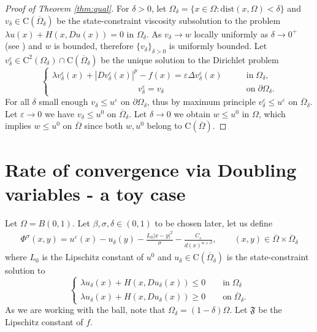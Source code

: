 \documentclass[11pt,reqno]{amsart}
\numberwithin{figure}{section}
\theoremstyle{plain}
\theoremstyle{remark}
\numberwithin{equation}{section}
\newcommand{\rmC}{\mathrm{C}}
\begin{document}
\begin{proof}[Proof of Theorem \ref{thm:qual}]
For $\delta>0$, let $\Omega_\delta = \{x\in \Omega: \mathrm{dist}(x,\Omega) < \delta\}$ and $v_\delta\in\rmC(\overline{\Omega}_\delta)$ be the state-constraint viscosity subsolution to the problem $\lambda u(x) + H(x,Du(x)) = 0$ in $\Omega_\delta$. As $v_\delta\rightarrow w$ locally uniformly as $\delta\rightarrow 0^+$ (see \cite{kim_state-constraint_2020}) and $w$ is bounded, therefore $\{v_\delta\}_{\delta>0}$ is uniformly bounded. Let $v^\varepsilon_\delta\in \rmC^2(\Omega_\delta)\cap \rmC(\overline{\Omega}_\delta)$ be the unique solution to the Dirichlet problem
\begin{equation}\label{eq:vv_eps}
\begin{cases}
    \lambda v_\delta^\varepsilon(x) + |Dv_\delta^\varepsilon(x)|^p - f(x) = \varepsilon \Delta v_\delta^\varepsilon(x) &\qquad\text{in}\;\Omega_\delta,\\
    \;\;\;\,\quad\qquad\qquad\qquad\qquad v_\delta^\varepsilon = v_\delta &\qquad \text{on}\;\partial\Omega_\delta.
\end{cases}
\end{equation}
For all $\delta$ small enough $v_\delta\leq u^\varepsilon$ on $\partial \Omega_\delta$, thus by maximum principle $v^\varepsilon_\delta \leq u^\varepsilon$ on $\overline{\Omega}_\delta$. Let $\varepsilon\to 0$ we have $v_\delta \leq u^0$ on $\overline{\Omega}_\delta$.
Let $\delta\rightarrow 0$ we obtain $w\leq u^0$ in $\Omega$, which implies $w\leq u^0$ on $\overline{\Omega}$ since both $w,u^0$ belong to $\rmC(\overline{\Omega})$.
\end{proof}

\section{Rate of convergence via Doubling variables - a toy case}
\noindent Let $\Omega = B(0,1)$. Let $\beta,\sigma,\delta \in (0,1)$ to be chosen later, let us define
\begin{align*}
    \Phi^{\sigma}(x,y) =  u^\varepsilon(x) - u_\delta(y) - \frac{L_0|x-y|^2}{\sigma}- \frac{C_\varepsilon}{d(x)^{\alpha+\beta}}, \qquad (x,y)\in \overline{\Omega}\times\overline{\Omega}_\delta
\end{align*}
where $L_0$ is the Lipschitz constant of $u^0$ and $u_\delta\in \mathrm{C}(\overline{\Omega}_\delta)$ is the state-constraint solution to
\begin{equation*}
    \begin{cases}  
    \lambda u_\delta(x) + H(x,Du_\delta(x)) \leq 0 \qquad\text{in}\; \Omega_\delta\\
    \lambda u_\delta(x) + H(x,Du_\delta(x)) \geq 0 \qquad\text{on}\; \overline{\Omega}_\delta.
    \end{cases}
\end{equation*}
As we are working with the ball, note that $\Omega_\delta = (1-\delta)\Omega$. Let $\mathfrak{F}$ be the Lipschitz constant of $f$.
\end{document}
